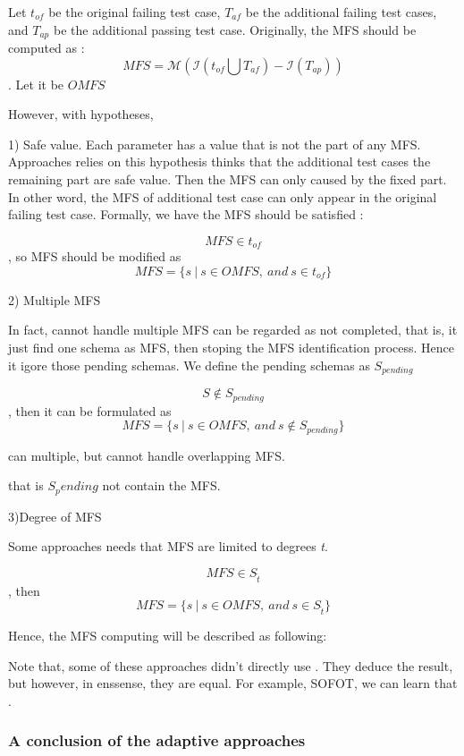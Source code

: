 \documentclass[10pt,journal,cspaper,compsoc]{IEEEtran}
\begin{document}
Let $t_{of}$ be the original failing test case, $T_{af}$ be the additional failing test cases, and $T_{ap}$ be the additional passing test case. Originally, the MFS should be computed as :
$$ MFS =  \mathcal{M}(\mathcal{I}(t_{of} \bigcup T_{af}) - \mathcal{I}(T_{ap})) $$. Let it be $OMFS$

However, with hypotheses,

1) Safe value.  Each parameter has a value that is not the part of any MFS. Approaches relies on this hypothesis thinks that the additional test cases the remaining part are safe value. Then the MFS can only caused by the fixed part. In other word, the MFS of additional test case can only appear in the original failing test case. Formally, we have the MFS should be satisfied :

$$ MFS \in  t_{of}$$, so MFS should be modified as  $$ MFS = \{ s\ |\ s \in OMFS,\ and\ s \in t_{of} \} $$

2) Multiple MFS

In fact, cannot handle multiple MFS can be regarded as not completed, that is, it just find one schema as MFS, then stoping the MFS identification process. Hence it igore those pending schemas. We define the pending schemas as $S_{pending}$

$$S \not\in S_{pending}$$, then it can be formulated as  $$ MFS = \{ s\ |\ s \in OMFS,\ and\ s \not\in S_{pending} \} $$

can multiple, but cannot handle overlapping MFS.

that is $S_pending$ not contain the MFS.

3)Degree of MFS

Some approaches needs that MFS are limited  to degrees \emph{t}.

$$ MFS \in  S_{\hat{t}}$$,
then
$$ MFS = \{ s\ |\ s \in OMFS,\ and\ s \in S_{\hat{t}} \} $$



Hence, the MFS computing will be described as following:

Note that, some of these approaches didn't directly use . They deduce the result, but however, in enssense, they are equal. For example, SOFOT, we can learn that .


\subsubsection{A conclusion of the adaptive approaches}
\end{document}
